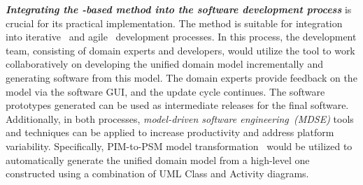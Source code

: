 \textbf{\textit{Integrating the \agldcsl-based method into the software development process}} is crucial for its practical implementation. The method is suitable for integration into iterative~\cite{larman_applying_2004} and agile~\cite{beck_manifesto_2017} development processes. In this process, the development team, consisting of domain experts and developers, would utilize the \agldcsl tool to work collaboratively on developing the unified domain model incrementally and generating software from this model. The domain experts provide feedback on the model via the software GUI, and the update cycle continues. The software prototypes generated can be used as intermediate releases for the final software. Additionally, in both processes, \textit{model-driven software engineering~(MDSE)} tools and techniques can be applied to increase productivity and address platform variability. Specifically, PIM-to-PSM model transformation~\cite{kent_model_2002,brambilla_model-driven_2012} would be utilized to automatically generate the unified domain model from a high-level one constructed using a combination of UML Class and Activity diagrams.

